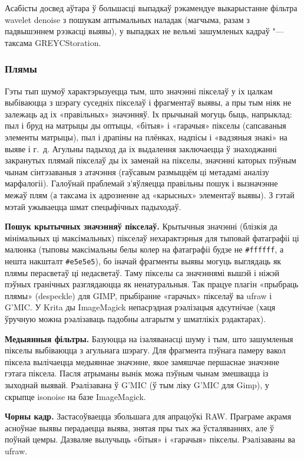 \documentclass[10pt, a5paper]{article}
\def\vv!#1!{\texttt{#1}}
\def\fakeparagraph#1{\textbf{#1}}
\begin{document}
{{Асабісты досвед аўтара ў большасці выпадкаў рэкамендуе выкарыстанне фільтра wavelet denoise з пошукам аптымальных наладак (магчыма, разам з падвышэннем рэзкасці выявы), у выпадках не вельмі зашумленых кадраў "--- таксама GREYCStoration.}

\subsubsection*{Плямы}
Гэты тып шумоў характэрызуецца тым, што значэнні пікселаў у іх цалкам выбіваюцца з шэрагу суседніх пікселаў і фрагментаў выявы, а пры тым ніяк не залежаць ад іх «правільных» значэнняў. Іх прычынай могуць быць, напрыклад: пыл і бруд на матрыцы ды оптыцы, «бітыя» і «гарачыя» пікселы (сапсаваныя элементы матрыцы), пыл і драпіны на плёнках, надпісы і «вадзяныя знакі» на выяве і г.~д. Агульны падыход да іх выдалення заключаецца ў знаходжанні закранутых плямай пікселаў ды іх заменай на пікселы, значэнні каторых пэўным чынам сінтэзаваныя з атачэння (гаўсавым размыццём ці метадамі аналізу марфалогіі). Галоўнай праблемай з’яўляецца правільны пошук і вызначэнне межаў плям (а таксама іх адрозненне ад «карысных» элементаў выявы). З гэтай мэтай ужываецца шмат спецыфічных падыходаў.

\fakeparagraph{Пошук крытычных значэнняў пікселаў.}
Крытычныя значэнні (блізкія да мінімальных ці максімальных) пікселаў нехарактэрныя для тыповай фатаграфіі ці малюнка (тыповы максімальны белы колер на фатаграфіі будзе не \vv!\#ffffff!, а нешта накшталт \vv!\#e5e5e5!), бо іначай фрагменты выявы могуць выглядаць як плямы перасветаў ці недасветаў. Таму пікселы са значэннямі вышэй і ніжэй пэўных гранічных разглядаюцца як ненатуральныя. Так працуе плагін «прыбраць плямы» ({despeckle}) для {GIMP}, прыбіранне «гарачых» пікселаў ва {ufraw} і {G'MIC}. У {Krita} ды {ImageMagick} непасрэдная рэалізацыя адсутнічае (хаця ўручную можна рэалізаваць падобны алгарытм у шматлікіх рэдактарах).

\fakeparagraph{Медыянныя фільтры.}
Базуюцца на ізаляванасці шуму і тым, што зашумленыя пікселы выбіваюцца з агульнага шэрагу. Для фрагмента пэўнага памеру вакол піксела вылічаецца медыяннае значэнне, якое замяшчае першаснае значэнне гэтага піксела. Пасля атрыманы вынік можа пэўным чынам змешвацца із зыходнай выявай. Рэалізавана ў {G'MIC} (ў тым ліку {G'MIC для Gimp}), у скрыпце {isonoise} \cite{litvw3} на базе {ImageMagick}.

\fakeparagraph{Чорны кадр.}
Застасоўваецца збольшага для апрацоўкі RAW. Праграме акрамя асноўнае выявы перадаецца выява, знятая пры тых жа ўсталяваннях, але ў поўнай цемры. Дазваляе вылучыць «бітыя» і «гарачыя» пікселы. Рэалізаваны ва {ufraw}.

}
\end{document}
